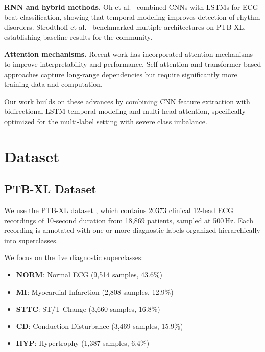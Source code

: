 \documentclass[conference]{IEEEtran}
\begin{document}
\textbf{RNN and hybrid methods.} Oh et al.\ \cite{oh2018automated} combined CNNs with LSTMs for ECG beat classification, showing that temporal modeling improves detection of rhythm disorders. Strodthoff et al.\ \cite{strodthoff2021deep} benchmarked multiple architectures on PTB-XL, establishing baseline results for the community.

\textbf{Attention mechanisms.} Recent work has incorporated attention mechanisms to improve interpretability and performance. Self-attention and transformer-based approaches \cite{natarajan2020wide} capture long-range dependencies but require significantly more training data and computation.

Our work builds on these advances by combining CNN feature extraction with bidirectional LSTM temporal modeling and multi-head attention, specifically optimized for the multi-label setting with severe class imbalance.

\section{Dataset}

\subsection{PTB-XL Dataset}

We use the PTB-XL dataset \cite{wagner2020ptbxl}, which contains 20373 clinical 12-lead ECG recordings of 10-second duration from 18,869 patients, sampled at 500\,Hz. Each recording is annotated with one or more diagnostic labels organized hierarchically into superclasses.

We focus on the five diagnostic superclasses:
\begin{itemize}
    \item \textbf{NORM}: Normal ECG (9,514 samples, 43.6\%)
    \item \textbf{MI}: Myocardial Infarction (2,808 samples, 12.9\%)
    \item \textbf{STTC}: ST/T Change (3,660 samples, 16.8\%)
    \item \textbf{CD}: Conduction Disturbance (3,469 samples, 15.9\%)
    \item \textbf{HYP}: Hypertrophy (1,387 samples, 6.4\%)
\end{itemize}
\end{document}
